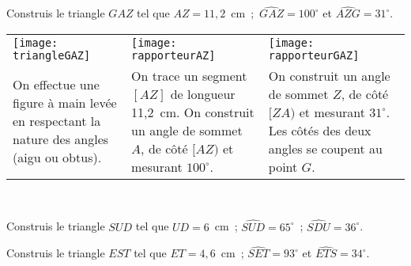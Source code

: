 
\begin{methode*1}

 \begin{exemple*1}
Construis le triangle $GAZ$ tel que $AZ = 11,2$ cm ; $\widehat{GAZ} = 100^\circ$ et $\widehat{AZG} = 31^\circ$. \\[1em]
\begin{tabularx}{\textwidth}{X|X|X}
 \texttt{[image: triangleGAZ]} &  \texttt{[image: rapporteurAZ]} & \texttt{[image: rapporteurGAZ]} \\ 
 On effectue une figure à main levée en respectant la nature des angles (aigu ou obtus). & On trace un segment $[AZ]$ de longueur 11,2 cm. On construit un angle de sommet $A$, de côté $[AZ)$ et mesurant $100^\circ$. & On construit un angle de sommet $Z$, de côté $[ZA)$ et mesurant $31^\circ$. Les côtés des deux angles se coupent au point $G$. \\
\end{tabularx} \\

\end{exemple*1}

\exercice
Construis le triangle $SUD$ tel que $UD = 6$ cm ; $\widehat{SUD} = 65^\circ$ ; $\widehat{SDU} = 36^\circ$.

\exercice
Construis le triangle $EST$ tel que $ET = 4,6$ cm ; $\widehat{SET} = 93^\circ$ et $\widehat{ETS} = 34^\circ$.
 
\end{methode*1}



